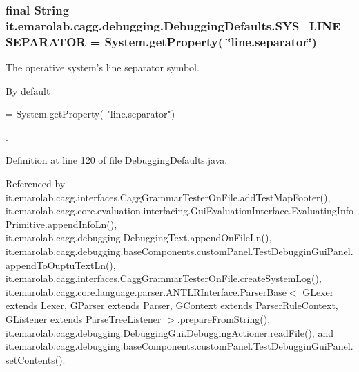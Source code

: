 \hypertarget{classit_1_1emarolab_1_1cagg_1_1debugging_1_1DebuggingDefaults_a5fc80b23dc9aafafd985eb9b71f94dbc}{
\subsubsection[{S\-Y\-S\-\_\-\-L\-I\-N\-E\-\_\-\-S\-E\-P\-A\-R\-A\-T\-O\-R}]{\setlength{\rightskip}{0pt plus 5cm}final String it.\-emarolab.\-cagg.\-debugging.\-Debugging\-Defaults.\-S\-Y\-S\-\_\-\-L\-I\-N\-E\-\_\-\-S\-E\-P\-A\-R\-A\-T\-O\-R = System.\-get\-Property( \char`\"{}line.\-separator\char`\"{})\hspace{0.3cm}{\ttfamily [static]}}}\label{classit_1_1emarolab_1_1cagg_1_1debugging_1_1DebuggingDefaults_a5fc80b23dc9aafafd985eb9b71f94dbc}
The operative system's line separator symbol.\par
 By default
\begin{DoxyCode}
= System.getProperty( \textcolor{stringliteral}{"line.separator"}) 
\end{DoxyCode}
 . 

Definition at line 120 of file Debugging\-Defaults.\-java.



Referenced by it.\-emarolab.\-cagg.\-interfaces.\-Cagg\-Grammar\-Tester\-On\-File.\-add\-Test\-Map\-Footer(), it.\-emarolab.\-cagg.\-core.\-evaluation.\-interfacing.\-Gui\-Evaluation\-Interface.\-Evaluating\-Info\-Primitive.\-append\-Info\-Ln(), it.\-emarolab.\-cagg.\-debugging.\-Debugging\-Text.\-append\-On\-File\-Ln(), it.\-emarolab.\-cagg.\-debugging.\-base\-Components.\-custom\-Panel.\-Test\-Debuggin\-Gui\-Panel.\-append\-To\-Ouptu\-Text\-Ln(), it.\-emarolab.\-cagg.\-interfaces.\-Cagg\-Grammar\-Tester\-On\-File.\-create\-System\-Log(), it.\-emarolab.\-cagg.\-core.\-language.\-parser.\-A\-N\-T\-L\-R\-Interface.\-Parser\-Base$<$ G\-Lexer extends Lexer, G\-Parser extends Parser, G\-Context extends Parser\-Rule\-Context, G\-Listener extends Parse\-Tree\-Listener $>$.\-prepare\-From\-String(), it.\-emarolab.\-cagg.\-debugging.\-Debugging\-Gui.\-Debugging\-Actioner.\-read\-File(), and it.\-emarolab.\-cagg.\-debugging.\-base\-Components.\-custom\-Panel.\-Test\-Debuggin\-Gui\-Panel.\-set\-Contents().

